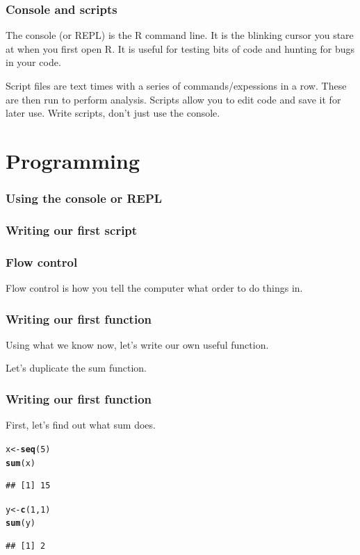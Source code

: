 \documentclass{beamer}\usepackage{graphicx, color}
\makeatletter
\newcommand{\hlfunctioncall}[1]{\textcolor[rgb]{0.501960784313725,0,0.329411764705882}{\textbf{#1}}}%
\newenvironment{kframe}{%
 \def\at@end@of@kframe{}%
 \ifinner\ifhmode%
  \def\at@end@of@kframe{\end{minipage}}%
  \begin{minipage}{\columnwidth}%
 \fi\fi%
 \def\FrameCommand##1{\hskip\@totalleftmargin \hskip-\fboxsep
 \colorbox{shadecolor}{##1}\hskip-\fboxsep
     \hskip-\linewidth \hskip-\@totalleftmargin \hskip\columnwidth}%
 \MakeFramed {\advance\hsize-\width
   \@totalleftmargin\z@ \linewidth\hsize
   \@setminipage}}%
 {\par\unskip\endMakeFramed%
 \at@end@of@kframe}
\newenvironment{knitrout}{}{} %
\makeatother
\begin{document}
\begin{frame}
  \frametitle{Console and scripts}
  The console (or REPL) is the R command line. It is the blinking cursor you stare at when you first open R. It is useful for testing bits of code and hunting for bugs in your code.

  Script files are text times with a series of commands/expessions in a row. These are then run to perform analysis. Scripts allow you to edit code and save it for later use. Write scripts, don't just use the console.

\end{frame}


\section{Programming}
\begin{frame}
  \frametitle{Using the console or REPL}

\end{frame}

\begin{frame}
  \frametitle{Writing our first script}

\end{frame}

\begin{frame}
  \frametitle{Flow control}
  Flow control is how you tell the computer what order to do things in.

\end{frame}

\begin{frame}
  \frametitle{Writing our first function}
  Using what we know now, let's write our own useful function.

  Let's duplicate the sum function.

\end{frame}

\begin{frame}[fragile]
  \frametitle{Writing our first function}

  First, let's find out what sum does.

\begin{knitrout}\small
{}\color{fgcolor}\begin{kframe}
\begin{alltt}
x <- \hlfunctioncall{seq}(5)
\hlfunctioncall{sum}(x)
\end{alltt}
\begin{verbatim}
## [1] 15
\end{verbatim}
\begin{alltt}

y <- \hlfunctioncall{c}(1, 1)
\hlfunctioncall{sum}(y)
\end{alltt}
\begin{verbatim}
## [1] 2
\end{verbatim}
\end{kframe}
\end{knitrout}


\end{frame}
\end{document}
